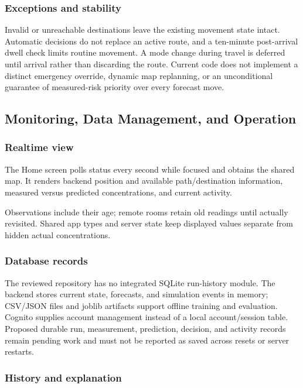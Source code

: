 \documentclass[conference]{IEEEtran}
\begin{document}
\subsubsection{Exceptions and stability}

Invalid or unreachable destinations leave the existing movement state intact. Automatic decisions do not replace an active route, and a ten-minute post-arrival dwell check limits routine movement. A mode change during travel is deferred until arrival rather than discarding the route. Current code does not implement a distinct emergency override, dynamic map replanning, or an unconditional guarantee of measured-risk priority over every forecast move.

\subsection{Monitoring, Data Management, and Operation}

\subsubsection{Realtime view}

The Home screen polls status every second while focused and obtains the shared map. It renders backend position and available path/destination information, measured versus predicted concentrations, and current activity.

Observations include their age; remote rooms retain old readings until actually revisited. Shared app types and server state keep displayed values separate from hidden actual concentrations.

\subsubsection{Database records}

The reviewed repository has no integrated SQLite run-history module. The backend stores current state, forecasts, and simulation events in memory; CSV/JSON files and joblib artifacts support offline training and evaluation. Cognito supplies account management instead of a local account/session table. Proposed durable run, measurement, prediction, decision, and activity records remain pending work and must not be reported as saved across resets or server restarts.

\subsubsection{History and explanation}
\end{document}
